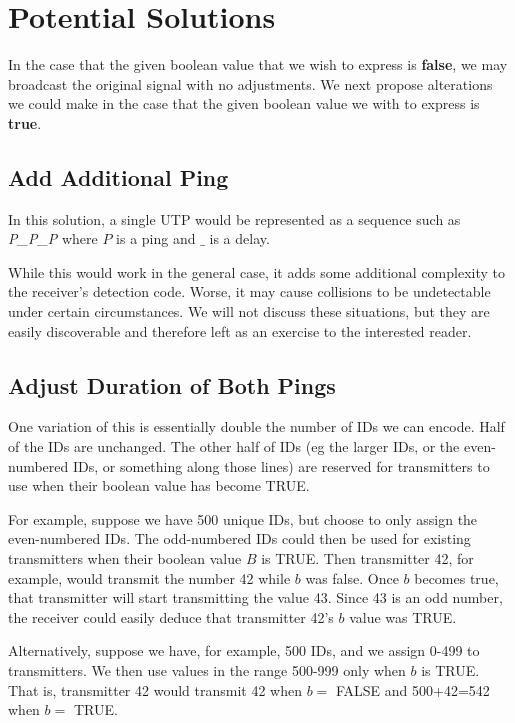 \documentclass[12pt]{article}
\begin{document}
\section{Potential Solutions}

In the case that the given boolean value that we wish to express is
{\bf false}, we may broadcast the original signal with no adjustments.
We next propose alterations we could make in the case that the given boolean
value we with to express is {\bf true}.

\subsection{Add Additional Ping}

In this solution, a single UTP would be represented as a sequence such as
{\em P\_P\_P} where $P$ is a ping and $\_$ is a delay.

While this would work in the general case, it adds some additional complexity
to the receiver's detection code.
Worse, it may cause collisions to be undetectable under certain circumstances.
We will not discuss these situations, but they are easily discoverable and
therefore left as an exercise to the interested reader.

\subsection{Adjust Duration of Both Pings}

One variation of this is essentially double the number of IDs we can encode.
Half of the IDs are unchanged.
The other half of IDs (eg the larger IDs, or the even-numbered IDs, or
something along those lines) are reserved for transmitters to use when their
boolean value has become TRUE.

For example, suppose we have 500 unique IDs, but choose to only assign the
even-numbered IDs.
The odd-numbered IDs could then be used for existing transmitters when their
boolean value $B$ is TRUE.
Then transmitter 42, for example, would transmit the number 42 while $b$ was
false.
Once $b$ becomes true, that transmitter will start transmitting the value 43.
Since 43 is an odd number, the receiver could easily deduce that transmitter
42's $b$ value was TRUE.

Alternatively, suppose we have, for example, 500 IDs, and we assign 0-499 to
transmitters.
We then use values in the range 500-999 only when $b$ is TRUE.
That is, transmitter 42 would transmit 42 when $b=$ FALSE and 500+42=542 when
$b=$ TRUE.
\end{document}
